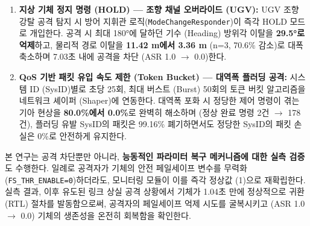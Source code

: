 \begin{enumerate}[leftmargin=*]
    \item \textbf{지상 기체 정지 명령 (HOLD) --- 조향 채널 오버라이드 (UGV):} 
    UGV 조향 강탈 공격 탐지 시 방어 지휘관 로직(\texttt{ModeChangeResponder})이 즉각 HOLD 모드로 개입한다. 공격 시 최대 180°에 달하던 기수 (Heading) 방위각 이탈을 \textbf{29.5°로 억제}하고, 물리적 경로 이탈을 \textbf{11.42 m에서 3.36 m} (n=3, 70.6\% 감소)로 대폭 축소하며 7.03초 내에 공격을 차단 (ASR 1.0 $\to$ 0.0)한다.

    \item \textbf{QoS 기반 패킷 유입 속도 제한 (Token Bucket) --- 대역폭 플러딩 공격:} 
    시스템 ID (SysID)별로 초당 25회, 최대 버스트 (Burst) 50회의 토큰 버킷 알고리즘을 네트워크 셰이퍼 (Shaper)에 연동한다. 대역폭 포화 시 정당한 제어 명령이 겪는 기아 현상을 \textbf{80.0\%에서 0.0\%}로 완벽히 해소하며 (정상 완료 명령 2건 $\to$ 178건), 플러딩 유발 SysID의 패킷은 99.16\% 폐기하면서도 정당한 SysID의 패킷 손실은 0\%로 안전하게 유지한다.
\end{enumerate}

본 연구는 공격 차단뿐만 아니라, \textbf{능동적인 파라미터 복구 메커니즘에 대한 실측 검증}도 수행한다. 일례로 공격자가 기체의 안전 페일세이프 변수를 무력화 (\texttt{FS\_THR\_ENABLE=0})하더라도, 모니터링 모듈이 이를 즉각 정상값 (1)으로 재확립한다. 실측 결과, 이후 유도된 링크 상실 공격 상황에서 기체가 1.04초 만에 정상적으로 귀환 (RTL) 절차를 발동함으로써, 공격자의 페일세이프 억제 시도를 굴복시키고 (ASR 1.0 $\to$ 0.0) 기체의 생존성을 온전히 회복함을 확인한다.


